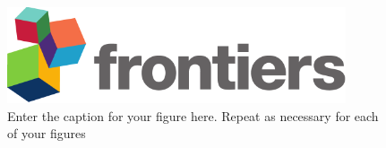 \documentclass[utf8]{FrontiersinVancouver}
\begin{document}





\begin{figure}[h!]
\begin{center}
\includegraphics[width=10cm]{logo1}%
\end{center}
\caption{ Enter the caption for your figure here.  Repeat as  necessary for each of your figures}\label{fig:1}
\end{figure}
\end{document}
